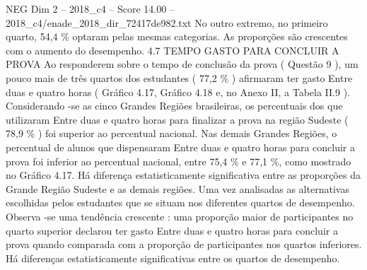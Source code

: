 \begin{textsample}{NEG Dim 2 – 2018\_c4 – Score 14.00 – 2018\_c4/enade\_2018\_dir\_72417de982.txt}
No outro extremo, no primeiro quarto, 54,4 \% optaram pelas mesmas categorias.
As proporções são crescentes com o aumento do desempenho. 4.7 TEMPO GASTO PARA CONCLUIR A PROVA Ao responderem sobre o tempo de conclusão da prova ( Questão 9 ), um pouco mais de três quartos dos estudantes ( 77,2 \% ) afirmaram ter gasto Entre duas e quatro horas ( Gráfico 4.17, Gráfico 4.18 e, no Anexo II, a Tabela II.9 ).
Considerando -se as cinco Grandes Regiões brasileiras, os percentuais dos que utilizaram Entre duas e quatro horas para finalizar a prova na região Sudeste ( 78,9 \% ) foi superior ao percentual nacional.
Nas demais Grandes Regiões, o percentual de alunos que dispensaram Entre duas e quatro horas para concluir a prova foi inferior ao percentual nacional, entre 75,4 \% e 77,1 \%, como mostrado no Gráfico 4.17.
Há diferença estatisticamente significativa entre as proporções da Grande Região Sudeste e as demais regiões.
Uma vez analisadas as alternativas escolhidas pelos estudantes que se situam nos diferentes quartos de desempenho.
Observa -se uma tendência crescente : uma proporção maior de participantes no quarto superior declarou ter gasto Entre duas e quatro horas para concluir a prova quando comparada com a proporção de participantes nos quartos inferiores.
Há diferenças estatisticamente significativas entre os quartos de desempenho.

\end{textsample}
